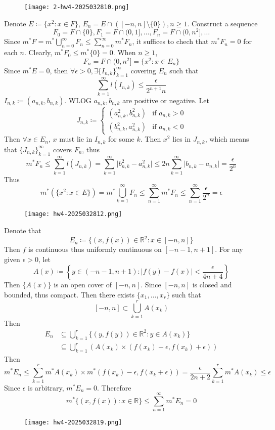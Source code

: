 \begin{figure}[H]
\centering
\texttt{[image: 2-hw4-2025032810.png]}
\label{}
\end{figure}

Denote $E\coloneqq \{ x^2:x\in F \}$, $E_n=E\cap([-n, n]\setminus \{ 0 \}),n\geq1$. Construct a sequence
\[
F_0=F\cap\{ 0 \},F_1=F\cap(0,1],\dots,F_n=F\cap(0,n^2],\dots
\]
Since $m^{*}F=m^{*}\bigcup_{n=0}^{\infty}F_n\leq \sum_{n=0}^{\infty}m^{*}F_n$, it suffices to chech that $m^{*}F_n=0$ for each $n$. Clearly, $m^{*}F_0\leq m^{*}\{ 0 \}=0$. When $n\geq1$,
\[
F_n=F\cap(0,n^2]=\{ x^2: x\in E_n\}
\]
Since $m^{*}E=0$, then $\forall\epsilon>0,\exists \{ I_{n,k} \}_{k=1}^{\infty}$ covering $E_n$ such that
\[
\sum_{k=1}^{\infty} l(I_{n,k})\leq \frac{\epsilon}{2^{n+1}n}
\]
$I_{n,k}\coloneqq(a_{n,k},b_{n,k})$. WLOG $a_{n,k},b_{n,k}$ are positive or negative. Let
\[
J_{n,k}\coloneqq \begin{cases}
(a_{n,k}^2,b_{n,k}^2) & \text{if }a_{n,k}>0 \\
(b_{n,k}^2,a_{n,k}^2) & \text{if }a_{n,k}<0
\end{cases}
\]
Then $\forall x\in E_n$, $x$ must lie in $I_{n,k}$ for some $k$. Then $x^2$ lies in $J_{n,k}$, which means that $\{ J_{n,k} \}_{k=1}^{\infty}$ covers $F_n$, thus
\[
m^{*}F_n\leq \sum_{k=1}^{\infty} l(J_{n,k})=\sum_{k=1}^{\infty} \lvert b^{2}_{n,k}-a_{n,k}^2 \rvert \leq 2n\sum_{k=1}^{\infty} \lvert b_{n,k}-a_{n,k} \rvert =\frac{\epsilon}{2^{n}}
\]
Thus
\[
m^{*}(\{ x^2:x\in E \})=m^{*}\bigcup_{k=1}^{\infty} F_n\leq \sum_{n=1}^{\infty} m^{*}F_n\leq \sum_{n=1}^{\infty} \frac{\epsilon}{2^{n}}=\epsilon
\]
\begin{figure}[H]
\centering
\texttt{[image: hw4-2025032812.png]}
\label{}
\end{figure}

Denote that
\[
E_n\coloneqq \{ (x,f(x))\in \mathbb{R}^{2}:x\in[-n,n] \}
\]
Then $f$ is continuous thus uniformly continuous on $[-n-1,n+1]$. For any given $\epsilon>0$, let
\[
A(x)\coloneqq\left\{  y\in(-n-1,n+1):\lvert f(y)-f(x) \rvert<\frac{\epsilon}{4n+4}  \right\}
\]
Then $\{ A(x) \}$ is an open cover of $[-n,n]$. Since $[-n,n]$ is closed and bounded, thus compact. Then there exists $\{ x_1,\dots,x_{r} \}$ such that
\[
[-n,n]\subset \bigcup_{k=1}^{r} A(x_k)
\]
Then
\[
\begin{aligned}
E_n & \subseteq \bigcup_{k=1}^{r} \{ (y,f(y))\in \mathbb{R}^2:y\in A(x_k) \} \\
 & \subseteq \bigcup_{k=1}^{r} (A(x_k)\times (f(x_k)-\epsilon,f(x_k)+\epsilon)) 
\end{aligned}
\]
Then
\[
m^{*}E_n\leq \sum_{k=1}^{r} m^{*}A(x_k)\times m^{*}(f(x_k)-\epsilon,f(x_k+\epsilon))=\frac{\epsilon}{2n+2} \sum_{k=1}^{r} m^{*}A(x_k)\leq \epsilon
\]
Since $\epsilon$ is arbitrary, $m^{*}E_n=0$. Therefore
\[
m^{*}\{ (x,f(x)):x\in \mathbb{R} \}\leq \sum_{n=1}^{\infty} m^{*}E_n=0
\]
\begin{figure}[H]
\centering
\texttt{[image: hw4-2025032819.png]}
\label{}
\end{figure}

